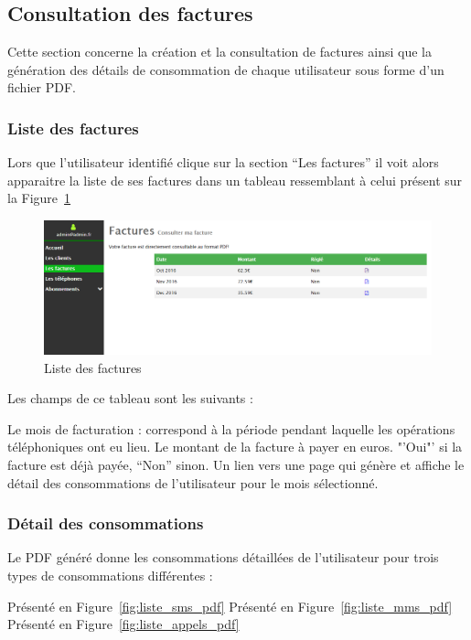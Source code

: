\subsection{Consultation des factures}
Cette section concerne la création et la consultation de factures ainsi que la génération des détails de consommation de chaque utilisateur sous forme d'un fichier PDF.
\subsubsection{Liste des factures}
Lors que l'utilisateur identifié clique sur la section "`Les factures"' il voit alors apparaitre la liste de ses factures dans un tableau ressemblant à celui présent sur la Figure~\ref{fig:listfacture}

\begin{figure}[ht]
  \centering
    \includegraphics[width=.55\textwidth]{images/Plateforme/liste_factures}
    \caption{Liste des factures}
    \label{fig:listfacture}
\end{figure}

Les champs de ce tableau sont les suivants :
\begin{itemize}
  Le mois de facturation : correspond à la période pendant laquelle les opérations téléphoniques ont eu lieu.
  Le montant de la facture à payer en euros.
  "'Oui"' si la facture est déjà payée, "`Non"' sinon.
  Un lien vers une page qui génère et affiche le détail des consommations de l'utilisateur pour le mois sélectionné.
\end{itemize}

\subsubsection{Détail des consommations}

Le PDF généré donne les consommations détaillées de l'utilisateur pour trois types de consommations différentes :
\begin{itemize}
	Présenté en Figure~\ref{fig:liste_sms_pdf}
	Présenté en Figure~\ref{fig:liste_mms_pdf}
	Présenté en Figure~\ref{fig:liste_appels_pdf}
\end{itemize}

